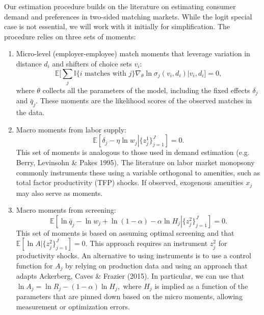 \documentclass[11pt]{article}
\begin{document}
Our estimation procedure builds on the literature on estimating consumer demand and preferences in two-sided matching markets. While the logit special case is not essential, we will work with it initially for simplification. The procedure relies on three sets of moments:
\begin{enumerate}
    \item Micro-level (employer-employee) match moments that leverage variation in distance $d_i$ and shifters of choice sets $v_i$:
        \[  \mathbb E \big[  \sum_j \mathbb I\{i \text{ matches with } j\}\nabla_\theta \ln\sigma_j(v_i,d_i) \big|  v_i, d_i \big] = 0,\]
    where $\theta$ collects all the parameters of the model, including the fixed effects $\delta_j$ and $\bar q_j$. These moments are the likelihood scores of the observed matches in the data.

    \item Macro moments from labor supply:
        \[ \mathbb E\left[ \delta_j - \eta\ln w_j\left| \{z_j^1\}_{j=1}^J \right.\right] = 0.\]
        This set of moments is analogous to those used in demand estimation (e.g. Berry, Levinsohn \& Pakes 1995). The literature on labor market monopsony commonly instruments these using a variable orthogonal to amenities, such as total factor productivity (TFP) shocks. If observed, exogenous amenities $x_j$ may also serve as moments.
        
    \item Macro moments from screening: 
     \[ \mathbb E\left[ \ln \bar q_j - \ln w_j + \ln (1-\alpha) - \alpha \ln H_j \left| \{z_j^2\}_{j=1}^J \right. \right] = 0.\]
    This set of moments is based on assuming optimal screening and that $\mathbb E \left[\ln A | \{z_j^2\}_{j=1}^J \right]=0$. This approach requires an instrument $z^2_j$ for productivity shocks. An alternative to using instruments is to use a control function for $A_j$ by relying on production data and using an approach that adapts Ackerberg, Caves \& Frazier (2015). In particular, we can use that $\ln A_j = \ln R_j - (1-\alpha) \ln H_j,$ where $H_j$ is implied as a function of the parameters that are pinned down based on the micro moments, allowing measurement or optimization errors.%
\end{enumerate}   
\end{document}
